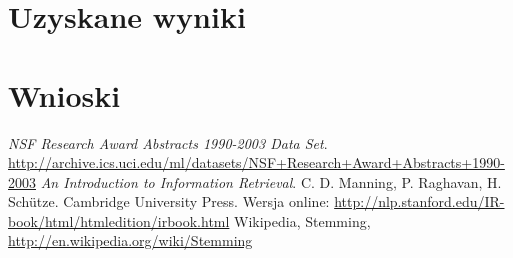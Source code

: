 \documentclass[a4paper,12pt]{article}
\begin{document}
\section{Uzyskane wyniki}

\section{Wnioski}


\begin{thebibliography}{9}

   \emph{NSF Research Award Abstracts 1990-2003 Data Set}.
   \url{http://archive.ics.uci.edu/ml/datasets/NSF+Research+Award+Abstracts+1990-2003}
	\emph{An Introduction to Information Retrieval}. 
	C. D. Manning, P. Raghavan, H. Sch\"utze.
	Cambridge University Press.
	Wersja online: \url{http://nlp.stanford.edu/IR-book/html/htmledition/irbook.html}
	Wikipedia, Stemming, \url{http://en.wikipedia.org/wiki/Stemming}

\end{thebibliography}
\end{document}
